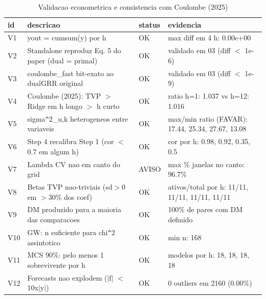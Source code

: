 \begin{table}[ht]
\centering
\begin{tabular}{llll}
  \hline
id & descricao & status & evidencia \\ 
  \hline
V1 & yout = cumsum(y) por h & OK & max diff em 4 h: 0.00e+00 \\ 
  V2 & Standalone reproduz Eq. 5 do paper (dual = primal) & OK & validado em 03 (diff $<$ 1e-6) \\ 
  V3 & coulombe\_fast bit-exato ao dualGRR original & OK & validado em 03 (diff $<$ 1e-9) \\ 
  V4 & Coulombe (2025): TVP $>$ Ridge em h longo $>$ h curto & OK & ratio h=1: 1.037 vs h=12: 1.016 \\ 
  V5 & sigma\verb|^|2\_u,k heterogeneos entre variaveis & OK & max/min ratio (FAVAR): 17.44, 25.34, 27.67, 13.08 \\ 
  V6 & Step 4 recalibra Step 1 (cor $<$ 0.7 em algum h) & OK & cor por h: 0.98, 0.92, 0.35, 0.5 \\ 
  V7 & Lambda CV nao em canto do grid & AVISO & max \% janelas no canto: 96.7\% \\ 
  V8 & Betas TVP nao-triviais (sd$>$0 em $>$30\% dos coef) & OK & ativos/total por h: 11/11, 11/11, 11/11, 11/11 \\ 
  V9 & DM produzido para a maioria das comparacoes & OK & 100\% de pares com DM definido \\ 
  V10 & GW: n suficiente para chi\verb|^|2 assintotico & OK & min n: 168 \\ 
  V11 & MCS 90\%: pelo menos 1 sobrevivente por h & OK & modelos por h: 18, 18, 18, 18 \\ 
  V12 & Forecasts nao explodem ($|$f$|$ $<$ 10x$|$y$|$) & OK & 0 outliers em 2160 (0.00\%) \\ 
   \hline
\end{tabular}
\caption{Validacao econometrica e consistencia com Coulombe (2025)} 
\label{tab:validacao}
\end{table}
